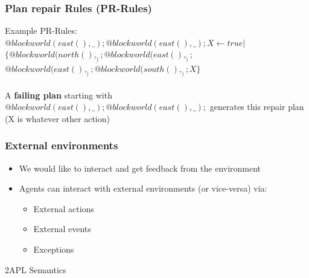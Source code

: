 \documentclass{beamer}
\newcommand\tab[1][1cm]{\hspace*{#1}}
\begin{document}
\begin{frame}
\frametitle{Plan repair Rules (PR-Rules)}
	\begin{block}{Example}
		PR-Rules:\\
        \tab $@blockworld(east(),\_);@blockworld(east(),\_);X \leftarrow true | $\\
	    \tab \tab $\{ @blockworld(north(),_);@blockworld(east(),_);$ \\
         \tab \tab $@blockworld(east(),_);@blockworld(south(),_);X \}$ \\~\\
         
	A \textbf{failing plan} starting with $@blockworld(east(),\_);@blockworld(east(),\_);$ generates this repair plan (X is whatever other action)
    \end{block}
\end{frame}


\begin{frame}
\frametitle{External environments}
\begin{itemize}
	\item We would like to interact and get feedback from the environment
	\item Agents can interact with external environments (or vice-versa) via:
    \begin{itemize}
    	\item External actions
        \item External events
        \item Exceptions
    \end{itemize}
\end{itemize}
\end{frame}

\begin{frame}
\Huge{\centerline{2APL Semantics}}
\end{frame}

\end{document}
